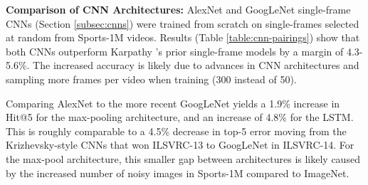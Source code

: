 \documentclass[10pt,twocolumn,letterpaper]{article}
\begin{document}
\begin{center}
  \begin{table}[t]
\hfill{}
\hfill{}
\vspace{-1em}
\caption{Conv-Pooling outperforms all other feature-pooling architectures (Figure \ref{fig:maxpool}) on Sports-1M using a 120-frame AlexNet model.}
\label{table:pooling}
\end{table}
\end{center}

\vspace{-1em}
\textbf{Comparison of CNN Architectures:}
\label{subsec:cnnbaselines}
AlexNet and GoogLeNet single-frame CNNs (Section \ref{subsec:cnns})
were trained from scratch on single-frames selected at random from
Sports-1M videos. Results (Table \ref{table:cnn-pairings}) show that
both CNNs outperform Karpathy \etal's prior single-frame models
\cite{karpathy2014large} by a margin of 4.3-5.6\%. The increased
accuracy is likely due to advances in CNN architectures and sampling
more frames per video when training (300 instead of 50).

Comparing AlexNet to the more recent GoogLeNet yields a
1.9\% increase in Hit@5 for the max-pooling architecture, and
an increase of 4.8\% for the LSTM. This is roughly comparable to a
 4.5\% decrease in top-5 error moving from the Krizhevsky-style
CNNs that won ILSVRC-13 to GoogLeNet in ILSVRC-14. For the max-pool architecture,
this smaller gap between architectures is likely caused by the increased number
of noisy images in Sports-1M compared to ImageNet.
\end{document}
